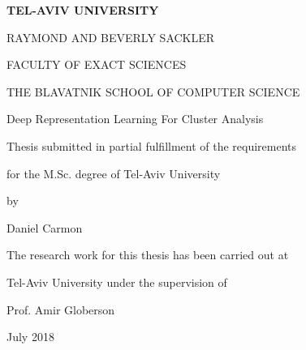 %
%

\begin{center}

\thispagestyle{empty}


\large\textbf{TEL-AVIV UNIVERSITY}

\large{RAYMOND AND BEVERLY SACKLER}

\large{FACULTY OF EXACT SCIENCES}

\large{THE BLAVATNIK SCHOOL OF COMPUTER SCIENCE}

\titlespace

\titlespace

\Huge{Deep Representation Learning For Cluster Analysis}\\


\titlespace

\titlespace

\large{Thesis submitted in partial fulfillment of the
requirements}

\large{for the M.Sc. degree of Tel-Aviv University}

\large{by}

\large{Daniel Carmon}

\titlespace

\titlespace

\large{The research work for this thesis has been carried out at}

\large{Tel-Aviv University under the supervision of}

\titlespace

\large{Prof. Amir Globerson}

\titlespace

\titlespace

\titlespace

\large{July 2018}

\end{center}

\cleardoublepage
